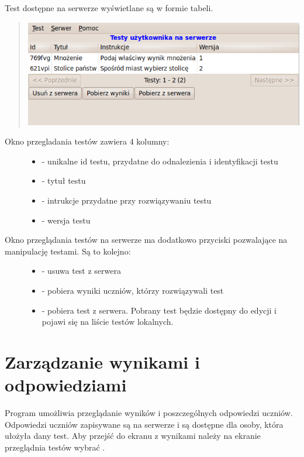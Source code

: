 \documentclass[letterpaper,10pt,polish]{sphinxmanual}
\begin{document}
Test dostępne na serwerze wyświetlane są w formie tabeli.
\begin{quote}

\includegraphics{PrzegladajNaSerwerze.png}
\end{quote}
\begin{description}
\item[{Okno przegladania testów zawiera 4 kolumny:}] \leavevmode\begin{itemize}
\item {} 
 - unikalne id testu, przydatne do odnalezienia i identyfikacji testu

\item {} 
 - tytuł testu

\item {} 
 - intrukcje przydatne przy rozwiązywaniu testu

\item {} 
 - wersja testu

\end{itemize}

\item[{Okno przeglądania testów na serwerze ma dodatkowo przyciski pozwalające na manipulację testami. Są to kolejno:}] \leavevmode\begin{itemize}
\item {} 
 - usuwa test z serwera

\item {} 
 - pobiera wyniki uczniów, którzy rozwiązywali test

\item {} 
 - pobiera test z serwera. Pobrany test będzie dostępny do edycji i pojawi się na liście testów lokalnych.

\end{itemize}

\end{description}


\section{Zarządzanie wynikami i odpowiedziami}
\label{index:zarzadzanie-wynikami-i-odpowiedziami}\label{index:zarzadzanie-wynikami}
Program umożliwia przeglądanie wyników i poszczególnych odpowiedzi uczniów. Odpowiedzi uczniów zapisywane są na serwerze i są dostępne dla osoby, która ułożyła dany test. Aby przejść do ekranu z wynikami należy na ekranie przeglądnia testów wybrać .
\end{document}
